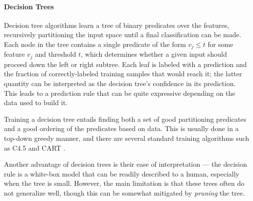 %
%


\paragraph{Decision Trees}
Decision tree algorithms learn a tree of binary predicates over the
features, recursively partitioning the input space until a final
classification can be made.
%
Each node in the tree contains a single predicate of the form
$v_j \leq t$ for some feature $v_j$ and threshold $t$, which determines
whether a given input should proceed down the left or right subtree.
%
Each leaf is labeled with a prediction and the fraction of
correctly-labeled training samples that would reach it; the latter
quantity can be interpreted as the decision tree's confidence in its
prediction.
%
This leads to a prediction rule that can be quite expressive depending
on the data used to build it.

Training a decision tree entails finding both a set of good partitioning
predicates and a good ordering of the predicates based on data.
%
This is usually done in a top-down greedy manner, and there are several
standard training algorithms such as C4.5 \citep{Quinlan1993-de} and
CART \citep{Breiman1984-qy}.

Another advantage of decision trees is their ease of interpretation ---
the decision rule is a white-box model that can be readily described to
a human, especially when the tree is small.
%
However, the main limitation is that these trees often do not generalize
well, though this can be somewhat mitigated by \emph{pruning} the tree.


%
%
%

